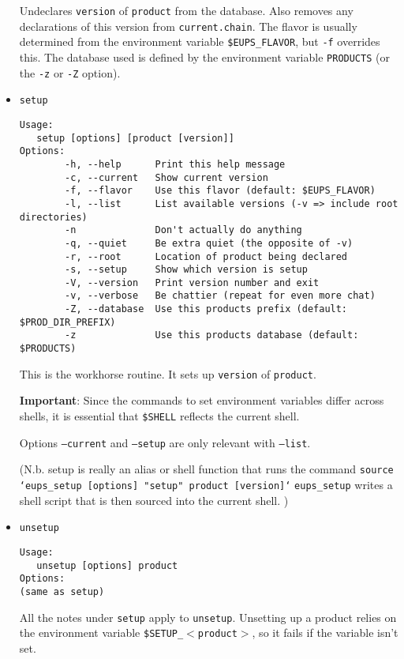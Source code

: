 \documentclass{article}
\begin{document}
\begin{itemize}
Undeclares \texttt{version} of \texttt{product} from the
database. Also removes any declarations of this version from
\texttt{current.chain}. The flavor is usually determined from the
environment variable \texttt{\$EUPS\_FLAVOR}, but \texttt{-f}
overrides this. The database used is defined by the environment
variable \texttt{PRODUCTS} (or the \texttt{-z} or \texttt{-Z} option).


\item \texttt{setup}
\begin{verbatim}
Usage:
   setup [options] [product [version]]
Options:
        -h, --help      Print this help message
        -c, --current   Show current version
        -f, --flavor    Use this flavor (default: $EUPS_FLAVOR)
        -l, --list      List available versions (-v => include root directories)
        -n              Don't actually do anything
        -q, --quiet     Be extra quiet (the opposite of -v)
        -r, --root      Location of product being declared
        -s, --setup     Show which version is setup
        -V, --version   Print version number and exit
        -v, --verbose   Be chattier (repeat for even more chat)
        -Z, --database  Use this products prefix (default: $PROD_DIR_PREFIX)
        -z              Use this products database (default: $PRODUCTS)
\end{verbatim}

This is the workhorse routine. It sets up \texttt{version} of \texttt{product}.

\textbf{Important}: Since the commands to set environment variables differ across shells,
it is essential that \texttt{\$SHELL} reflects the current shell.

Options \texttt{--current} and \texttt{--setup} are only relevant with \texttt{--list}.

(N.b. setup is really an alias or shell function that runs the command\hfil\break
\texttt{source `eups\_setup [options] "setup" product [version]`}\hfil\break
\texttt{eups\_setup} writes a shell script that is then sourced into the
current shell.
)


\item \texttt{unsetup}
\begin{verbatim}
Usage:
   unsetup [options] product
Options:
(same as setup)
\end{verbatim}
  
All the notes under \texttt{setup} apply to
\texttt{unsetup}. Unsetting up a product relies on the environment
variable \texttt{\$SETUP\_$<$product$>$}, so it fails if the variable
isn't set.

\end{itemize}
\end{document}
